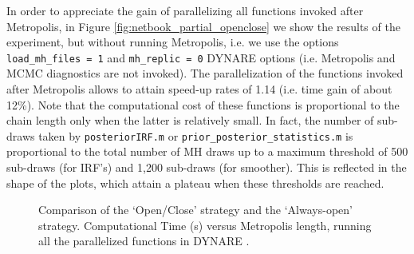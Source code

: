 \documentclass[12pt,a4paper,pdftex]{article}
\begin{document}
In order to appreciate the gain of parallelizing all functions invoked after Metropolis, in Figure \ref{fig:netbook_partial_openclose} we show the results of the experiment, but without running Metropolis, i.e. we use the options \verb"load_mh_files = 1" and \verb"mh_replic = 0" DYNARE options (i.e. Metropolis and MCMC diagnostics are not invoked). The parallelization of the functions invoked after Metropolis allows to attain speed-up rates of 1.14 (i.e. time gain of about 12\%). Note that the computational cost of these functions is proportional to the chain length only when the latter is relatively small. In fact, the number of sub-draws taken by \verb"posteriorIRF.m" or \verb"prior_posterior_statistics.m" is proportional to the total number of MH draws up to a maximum threshold of 500 sub-draws (for IRF's) and 1,200 sub-draws (for smoother). This is reflected in the shape of the plots, which attain a plateau when these thresholds are reached.
\begin{figure}
\begin{centering}
  \epsfxsize=300pt 
  \caption{Comparison of the `Open/Close' strategy and the `Always-open' strategy. Computational Time (s) versus Metropolis length, running all the parallelized functions in DYNARE \citep{Lubik2003}.}\label{fig:netbook_complete_comp}
\end{centering}
\end{figure}
\end{document}

